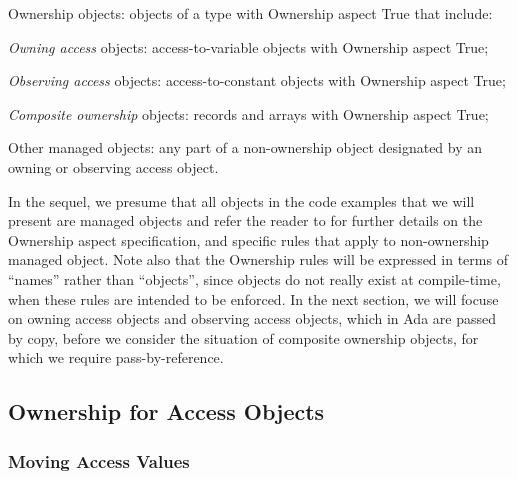 \documentclass{llncs}
\begin{document}
\begin{compactitem}
\item Ownership objects: objects of a type with Ownership aspect True that include:
    \begin{compactitem}
\item \textit{Owning access} objects: access-to-variable objects with Ownership aspect True;
\item \textit{Observing access} objects: access-to-constant objects with Ownership aspect True;
\item \textit{Composite ownership} objects: records and arrays with Ownership aspect True;
    \end{compactitem}
\item Other managed objects: any part of a non-ownership object designated by an owning or observing access object.
\end{compactitem}
In the sequel, we presume that all objects in the code examples that we will present are managed objects and refer the reader to \cite{AI2017} for further details on
the Ownership aspect specification, and specific rules that apply to non-ownership managed object. Note also that the Ownership rules will be expressed in terms
of ``names'' rather than ``objects'', since objects do not really exist at compile-time, when these rules are intended to be enforced. 
In the next section, we will focuse on owning access objects and observing access objects, which in Ada are passed by copy, before we
consider the situation of composite ownership objects, for which we require pass-by-reference.


\subsection{Ownership for Access Objects}
\label{subsec:ownershipAccess}

\subsubsection{Moving Access Values}
\label{sec:moving}
\ \\
\end{document}
